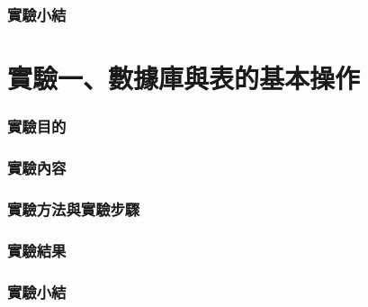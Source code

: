 \documentclass[12pt, a4paper]{report}
\begin{document}
\section{實驗小結}

\part{實驗一、數據庫與表的基本操作}

\section{實驗目的}



\section{實驗內容}

\section{實驗方法與實驗步驟}

\section{實驗結果}

\section{實驗小結}
\end{document}
